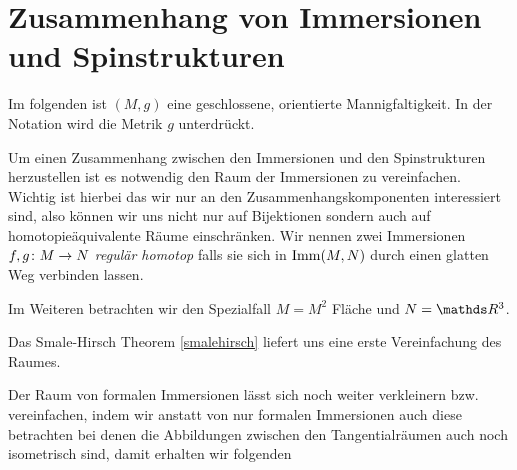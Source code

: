 


\section{Zusammenhang von Immersionen und Spinstrukturen}
\label{sec:Zusammenhang von Immersionen und Spinstrukturen}

Im folgenden ist $(M,g)$ eine geschlossene, orientierte Mannigfaltigkeit.
In der Notation wird die Metrik $g$ unterdrückt.


Um einen Zusammenhang zwischen den Immersionen und den Spinstrukturen
herzustellen ist es notwendig den Raum der Immersionen zu
vereinfachen.  Wichtig ist hierbei das wir nur an den
Zusammenhangskomponenten interessiert sind, also können wir uns nicht
nur auf Bijektionen sondern auch auf homotopieäquivalente Räume
einschränken.  Wir nennen zwei Immersionen $ f,g \colon M \rightarrow N $
\textit{regulär homotop} falls sie sich in $ \operatorname{Imm}(M,N) $ durch einen
glatten Weg verbinden lassen.

Im Weiteren betrachten wir den Spezialfall $ M=M^2 $ Fläche und
$ N=\R^3 $.

Das Smale-Hirsch Theorem \cref{smalehirsch} liefert uns eine erste Vereinfachung des Raumes. 

Der Raum von formalen Immersionen lässt sich noch weiter verkleinern
bzw. vereinfachen, indem wir anstatt von nur formalen Immersionen auch
diese betrachten bei denen die Abbildungen zwischen den
Tangentialräumen auch noch isometrisch sind, damit erhalten wir
folgenden


